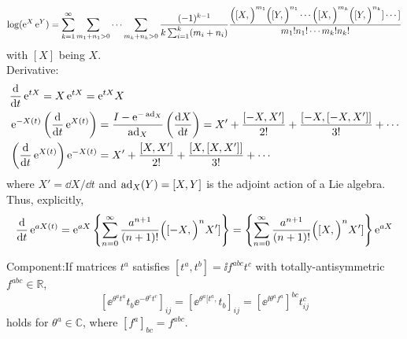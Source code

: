 \documentclass[CheatSheet]{subfiles}
\begin{document}
\begin{equation}
   \log(\mathop{}\!\mathrm{e}^X\mathop{}\!\mathrm{e}^Y)=\sum_{k=1}^{\infty}\sum_{m_1+n_1>0}\cdots\sum_{m_k+n_k>0}
\frac{(-1)^{k-1}}{k\sum_{i=1}^{k}(m_i+n_i)}
\frac{
\Bigl([X,\Bigr)^{m_1}
\Bigl([Y,\Bigr)^{n_1}\cdots
\Bigl([X,\Bigr)^{m_k}
\Bigl([Y,\Bigr)^{n_k}]\cdots]
}{m_1!n_1!\cdots m_k!n_k!}
\end{equation}
\hfill with $[X]$ being $X$.
\\
Derivative:
\begin{alignat}{1}
 &\frac{\dd}{\dd t}\ee^{tX} = X\ee^{t X} = \ee^{tX} X\\
 &\ee^{-X(t)}\left(\frac{\dd}{\dd t}\ee^{X(t)}\right) =
    \frac{I-\ee^{-\ad_X}}{\ad_X}\left(\frac{\dd X}{\dd t}\right)
  = X' + \frac{[-X,X']}{2!} + \frac{[-X,[-X,X']]}{3!} + \cdots
\\
 &\left(\frac{\dd}{\dd t}\ee^{X(t)}\right)\ee^{-X(t)}
= X' + \frac{[X,X']}{2!} + \frac{[X,[X,X']]}{3!} + \cdots
\end{alignat}
\hfill where $X'=\dd X/\dd t$ and $\operatorname{\mathrm{ad}}_X(Y)=[X,Y]$ is the adjoint action of a Lie algebra. Thus, explicitly,
\begin{alignat}{1}
\frac{\mathop{}\!\mathrm{d}}{\mathop{}\!\mathrm{d} t}\mathop{}\!\mathrm{e}^{aX(t)}
  = \mathop{}\!\mathrm{e}^{aX}\left\{\sum_{n=0}^\infty\frac{a^{n+1}}{(n+1)!}\Bigl([-X,\Bigr)^n X']\right\}
  = \left\{\sum_{n=0}^\infty\frac{a^{n+1}}{(n+1)!}\Bigl([X,\Bigr)^n X']\right\}\mathop{}\!\mathrm{e}^{aX}
\end{alignat}

\vspace{1em}

\noindent
Component:\quad If matrices $t^a$ satisfies $[t^a,t^b]=\ii f^{abc} t^c$ with totally-antisymmetric $f^{abc}\in\mathbb R$,
\begin{equation}
  \left[\ee^{\theta^at^a} t_b \ee^{-\theta^ct^c}\right]_{ij}
=  \left[\ee^{\theta^a[t^a,}t_b\right]_{ij}
= \left[\ee^{\ii \theta^af^{a}}\right]^{bc} t^c_{ij}
\end{equation}
holds for $\theta^a\in\mathbb C$, where $[f^a]_{bc}=f^{abc}$. 
\end{document}
